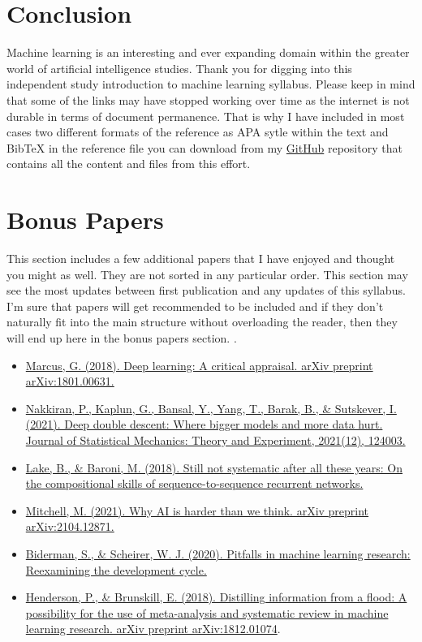 \documentclass{article}
\begin{document}
\section{Conclusion}
Machine learning is an interesting and ever expanding domain within the greater world of artificial intelligence studies. Thank you for digging into this independent study introduction to machine learning syllabus. Please keep in mind that some of the links may have stopped working over time as the internet is not durable in terms of document permanence. That is why I have included in most cases two different formats of the reference as APA sytle within the text and BibTeX in the reference file you can download from my \href{https://github.com/nelslindahlx/Introduction-to-machine-learning-syllabus-2022}{GitHub} repository that contains all the content and files from this effort. 

\section{Bonus Papers}
This section includes a few additional papers that I have enjoyed and thought you might as well. They are not sorted in any particular order. This section may see the most updates between first publication and any updates of this syllabus. I’m sure that papers will get recommended to be included and if they don’t naturally fit into the main structure without overloading the reader, then they will end up here in the bonus papers section. .

\begin{itemize}
\item \href{https://arxiv.org/ftp/arxiv/papers/1801/1801.00631.pdf}{Marcus, G. (2018). Deep learning: A critical appraisal. arXiv preprint arXiv:1801.00631.} \cite{marcus2018deep}
\item \href{https://arxiv.org/pdf/1912.02292.pdf}{Nakkiran, P., Kaplun, G., Bansal, Y., Yang, T., Barak, B., \& Sutskever, I. (2021). Deep double descent: Where bigger models and more data hurt. Journal of Statistical Mechanics: Theory and Experiment, 2021(12), 124003.} \cite{nakkiran2021deep} 
\item \href{https://openreview.net/pdf?id=H18WqugAb}{Lake, B., \& Baroni, M. (2018). Still not systematic after all these years: On the compositional skills of sequence-to-sequence recurrent networks.} \cite{lake2018still}
\item \href{https://arxiv.org/pdf/2104.12871.pdf}{Mitchell, M. (2021). Why AI is harder than we think. arXiv preprint arXiv:2104.12871.} \cite{mitchell2021ai} 
\item \href{http://proceedings.mlr.press/v137/biderman20a/biderman20a.pdf}{Biderman, S., \& Scheirer, W. J. (2020). Pitfalls in machine learning research: Reexamining the development cycle.} \cite{biderman2020pitfalls} 
\item \href{https://arxiv.org/pdf/1812.01074.pdf}{Henderson, P., \& Brunskill, E. (2018). Distilling information from a flood: A possibility for the use of meta-analysis and systematic review in machine learning research. arXiv preprint arXiv:1812.01074}. \cite{henderson2018distilling}
\end{itemize}
\end{document}
